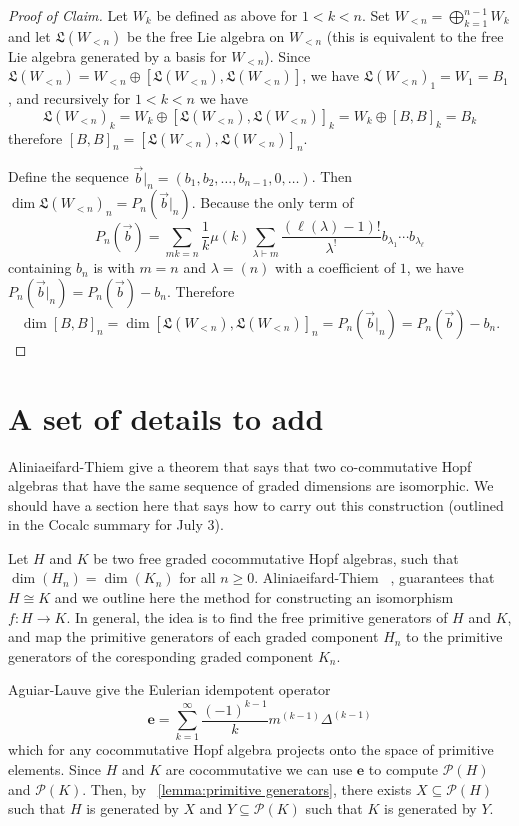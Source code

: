 \documentclass[11pt]{amsart}
\theoremstyle{definition}
\numberwithin{equation}{section}
\begin{document}
\begin{proof}[Proof of Claim]
Let $W_k$ be defined as above for $1 < k < n.$ Set $W_{<n} = \bigoplus_{k=1}^{n-1} W_k$ and let $\mathfrak{L}(W_{<n})$ be the free Lie algebra on $W_{<n}$  (this is equivalent to the free Lie algebra generated by a basis for $W_{<n}$). Since $\mathfrak{L}(W_{<n}) = W_{<n} \oplus [\mathfrak{L}(W_{<n}) , \mathfrak{L}(W_{<n})]$, we have $\mathfrak{L}(W_{<n})_1 = W_1 = B_1$, and recursively for $1 < k <n$ we have
\[
\mathfrak{L}(W_{<n})_k = W_k \oplus [\mathfrak{L}(W_{<n}) , \mathfrak{L}(W_{<n})]_k = W_k \oplus [B,B]_k = B_k
\]
therefore $[B,B]_n = [\mathfrak{L}(W_{<n}),\mathfrak{L}(W_{<n})]_n$.

Define the sequence $\vec{b} \vert_n = (b_1,b_2, \ldots , b_{n-1}, 0, \ldots)$. Then $\dim \mathfrak{L}(W_{<n})_n = P_n(\vec{b}|_n)$. Because the only term of 
\[ 
P_n(\vec{b}) = \sum_{mk=n} \frac{1}{k}\mu (k) \sum_{\lambda \vdash m} \frac{(\ell(\lambda)-1)!}{\lambda^!}b_{\lambda_1} \cdots b_{\lambda_{\ell}}
\]
containing $b_n$ is with $m = n$ and $\lambda = (n)$ with a coefficient of $1$, we have $P_n(\vec{b}|_n) = P_n(\vec{b}) - b_n$. Therefore
\[
\dim [B,B]_n = \dim [\mathfrak{L}(W_{<n}),\mathfrak{L}(W_{<n})]_n = P_n(\vec{b}|_n) = P_n(\vec{b})-b_n.
\]
\end{proof}

\section{A set of details to add}

Aliniaeifard-Thiem \cite[Theorem 4.2]{AT22} give a theorem that says that two co-commutative Hopf algebras that
have the same sequence of graded dimensions are isomorphic.  We should have a section here
that says how to carry out this construction (outlined in the Cocalc summary for July 3).

Let \(H\) and \(K\) be two free graded cocommutative Hopf algebras, such that \(\dim(H_n) = \dim(K_n)\) for all \(n \geq 0\).
Aliniaeifard-Thiem  ~\cite[Theorem 4.2]{AT22}, guarantees that \(H \cong K\) and we outline here the method for constructing an
isomorphism \(f:H \to K\).  In general, the idea is to find the free primitive generators of \(H\) and \(K\), and map the primitive generators of
each graded component \(H_n\) to the primitive generators of the  coresponding graded component \(K_n\).

Aguiar-Lauve \cite{AL15} give the Eulerian idempotent operator
\[
    \mathbf{e} = \sum_{k=1}^\infty \frac{(-1)^{k-1}}{k} m^{(k-1)} \Delta^{(k-1)}
\]
which for any cocommutative Hopf algebra projects onto the space of primitive elements. Since \(H\) and \(K\) are cocommutative
we can use \(\mathbf{e}\) to compute  \(\mathcal{P}(H)\) and \(\mathcal{P}(K)\).
Then, by ~\ref{lemma:primitive generators}, there exists \(X \subseteq \mathcal{P}(H)\) such that \(H\) is generated by \(X\)
and  \(Y \subseteq \mathcal{P}(K)\) such that  \(K\) is  generated by \(Y\).
\end{document}
